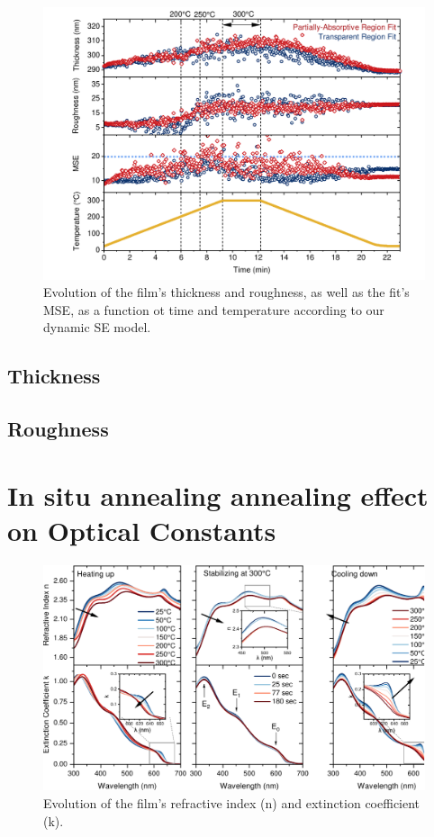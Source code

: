 \begin{figure}
  \centering
  \medskip
  \includegraphics[width=.99\textwidth]{chapters/ellipsometry/image/Roughness_Thickness.pdf}
  \caption{Evolution of the  film's thickness and roughness, as well as the fit's MSE, as a function ot time and temperature according to our dynamic SE model.}
  \label{fig:ellipsometry:roughness_thickness}
\end{figure}


\subsection{Thickness}
\subsection{Roughness}
\section{In situ annealing annealing effect on Optical Constants}

\begin{figure}
  \centering
  \medskip
  \includegraphics[width=.99\textwidth]{chapters/ellipsometry/image/Optical_constants.pdf}
  \caption{Evolution of the  film's refractive index (n) and extinction coefficient (k).}
  \label{fig:ellipsometry:optical_constants}
\end{figure}


